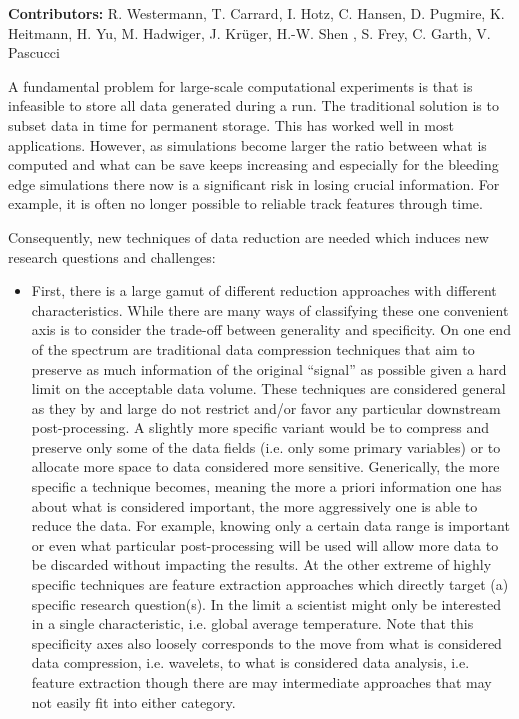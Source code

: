 \license

\begin{refsection}

\textbf{\sffamily Contributors:} R. Westermann, T. Carrard, I. Hotz, C. Hansen, D. Pugmire, K. Heitmann, H. Yu, M. Hadwiger, J. Krüger, H.-W. Shen , S. Frey, C. Garth, V. Pascucci

A fundamental problem for large-scale computational experiments is that is infeasible to store all data generated during a run. The traditional solution is to subset data in time for permanent storage. This has worked well in most applications. However, as simulations become larger the ratio between what is computed and what can be save keeps increasing and especially for the bleeding edge simulations there now is a significant risk in losing crucial information. For example, it is often no longer possible to reliable track features \cite{Widanagamaachchi15} through time. 

Consequently, new techniques of data reduction are needed which induces new research questions and challenges:

\begin{itemize}
\item
First, there is a large gamut of different reduction approaches with different characteristics. While there are many ways of classifying these one convenient axis is to consider the trade-off between generality and specificity. On one end of the spectrum are traditional data compression techniques that aim to preserve as much information of the original “signal” as possible given a hard limit on the acceptable data volume. These techniques are considered general as they by and large do not restrict and/or favor any particular downstream post-processing. A slightly more specific variant would be to compress and preserve only some of the data fields (i.e. only some primary variables) or to allocate more space to data considered more sensitive. Generically, the more specific a technique becomes, meaning the more a priori information one has about what is considered important, the more aggressively one is able to reduce the data. For example, knowing only a certain data range is important or even what particular post-processing will be used will allow more data to be discarded without impacting the results. At the other extreme of highly specific techniques are feature extraction approaches which directly target (a) specific research question(s). In the limit a scientist might only be interested in a single characteristic, i.e. global average temperature. Note that this specificity axes also loosely corresponds to the move from what is considered data compression, i.e. wavelets, to what is considered data analysis, i.e. feature extraction though there are may intermediate approaches that may not easily fit into either category.


\end{itemize}
\end{refsection}
